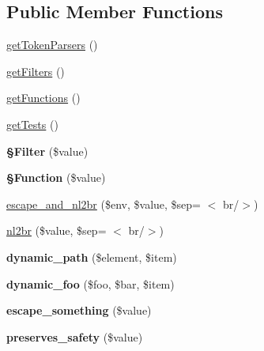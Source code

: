 \subsection*{Public Member Functions}
\begin{DoxyCompactItemize}
\item 
\hyperlink{classTwigTestExtension_a9d0a31b15c71838fad8198736d125129}{get\+Token\+Parsers} ()
\item 
\hyperlink{classTwigTestExtension_abd8cb0c939ca420dd40e08d0be19b058}{get\+Filters} ()
\item 
\hyperlink{classTwigTestExtension_ac05e9bb4035e39b39d53144b6c60bfcf}{get\+Functions} ()
\item 
\hyperlink{classTwigTestExtension_ae27ff1e69f28aead55316f44bb917d5e}{get\+Tests} ()
\item 
{\bfseries §\+Filter} (\$value)\hypertarget{classTwigTestExtension_a0c3f7a6fb1905a6f1480eaf87ea742b5}{}\label{classTwigTestExtension_a0c3f7a6fb1905a6f1480eaf87ea742b5}

\item 
{\bfseries §\+Function} (\$value)\hypertarget{classTwigTestExtension_a3aa261f682b80bbb40bc24f0f4cb8563}{}\label{classTwigTestExtension_a3aa261f682b80bbb40bc24f0f4cb8563}

\item 
\hyperlink{classTwigTestExtension_a341504d226b6641a1a0ace9d0d6fda88}{escape\+\_\+and\+\_\+nl2br} (\$env, \$value, \$sep= \textquotesingle{}$<$ br/$>$\textquotesingle{})
\item 
\hyperlink{classTwigTestExtension_a141db53891ab0784036e4a4eec2438f4}{nl2br} (\$value, \$sep= \textquotesingle{}$<$ br/$>$\textquotesingle{})
\item 
{\bfseries dynamic\+\_\+path} (\$element, \$item)\hypertarget{classTwigTestExtension_afa8e5b913f4b5f815766388aee4ccce8}{}\label{classTwigTestExtension_afa8e5b913f4b5f815766388aee4ccce8}

\item 
{\bfseries dynamic\+\_\+foo} (\$foo, \$bar, \$item)\hypertarget{classTwigTestExtension_ab697c17f1942a9b5ba7ca054ecceb0e4}{}\label{classTwigTestExtension_ab697c17f1942a9b5ba7ca054ecceb0e4}

\item 
{\bfseries escape\+\_\+something} (\$value)\hypertarget{classTwigTestExtension_a8eafbf402c6954c96e0db28fb3364d82}{}\label{classTwigTestExtension_a8eafbf402c6954c96e0db28fb3364d82}

\item 
{\bfseries preserves\+\_\+safety} (\$value)\hypertarget{classTwigTestExtension_a9edfcdb8e7381aa17974e0eaba556a1e}{}\label{classTwigTestExtension_a9edfcdb8e7381aa17974e0eaba556a1e}


\end{DoxyCompactItemize}
